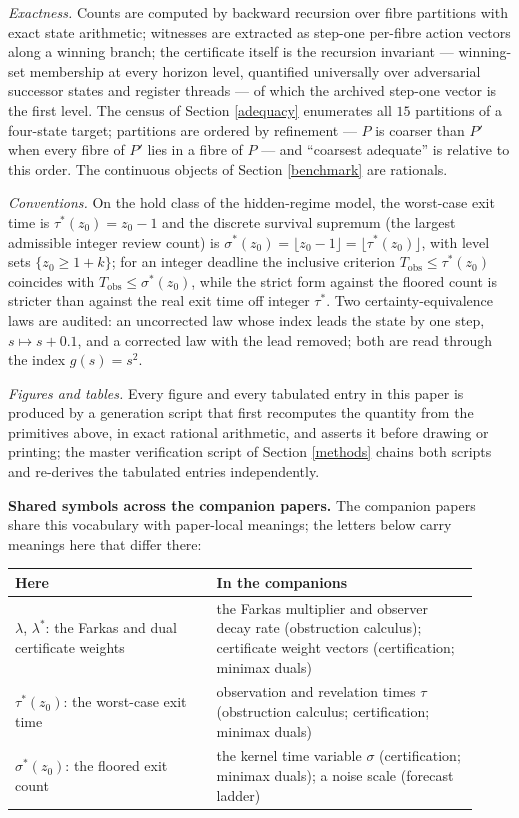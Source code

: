 \documentclass[10pt,twocolumn]{article}
\theoremstyle{definition}
\begin{document}
\emph{Exactness.} Counts are computed by backward recursion over fibre
partitions with exact state arithmetic; witnesses are extracted as step-one per-fibre action vectors along a winning branch; the certificate itself is the recursion invariant --- winning-set membership at every horizon level, quantified universally over adversarial successor states and register threads --- of which the archived step-one vector is the first level. The census of
Section \ref{adequacy} enumerates all \(15\) partitions of a four-state
target; partitions are ordered by refinement --- \(P\) is coarser than
\(P'\) when every fibre of \(P'\) lies in a fibre of \(P\) --- and
``coarsest adequate'' is relative to this order. The continuous objects of Section \ref{benchmark} are rationals.

\emph{Conventions.} On the hold class of the hidden-regime model, the
worst-case exit time is \(\tau^{*}(z_0) = z_0 - 1\) and the discrete
survival supremum (the largest admissible integer review count) is
\(\sigma^{*}(z_0) = \lfloor z_0 - 1 \rfloor = \lfloor \tau^{*}(z_0)
\rfloor\), with level sets \(\{z_0 \ge 1 + k\}\); for an integer deadline
the inclusive criterion \(T_{\mathrm{obs}} \le \tau^{*}(z_0)\) coincides
with \(T_{\mathrm{obs}} \le \sigma^{*}(z_0)\), while the strict form
against the floored count is stricter than against the real exit time off
integer \(\tau^{*}\). Two
certainty-equivalence laws are audited: an uncorrected law whose index
leads the state by one step, \(s \mapsto s + 0.1\), and a corrected law
with the lead removed; both are read through the index \(g(s) = s^{2}\).

\emph{Figures and tables.} Every figure and every tabulated entry in
this paper is produced by a generation script that first recomputes the
quantity from the primitives above, in exact rational arithmetic, and
asserts it before drawing or printing; the master verification script of
Section \ref{methods} chains both scripts and re-derives the tabulated
entries independently.

\medskip
\noindent\textbf{Shared symbols across the companion papers.} The
companion papers share this vocabulary with paper-local meanings; the
letters below carry meanings here that differ there:
\begin{center}\small
\begin{tabular}{@{}p{0.40\linewidth}p{0.52\linewidth}@{}}
\toprule
\textbf{Here} & \textbf{In the companions} \\
\midrule
\(\lambda\), \(\lambda^{*}\): the Farkas and dual certificate weights &
the Farkas multiplier and observer decay rate (obstruction calculus);
certificate weight vectors (certification; minimax duals) \\
\(\tau^{*}(z_0)\): the worst-case exit time &
observation and revelation times \(\tau\) (obstruction calculus;
certification; minimax duals) \\
\(\sigma^{*}(z_0)\): the floored exit count &
the kernel time variable \(\sigma\) (certification; minimax duals);
a noise scale (forecast ladder) \\
\bottomrule
\end{tabular}
\end{center}
\end{document}
